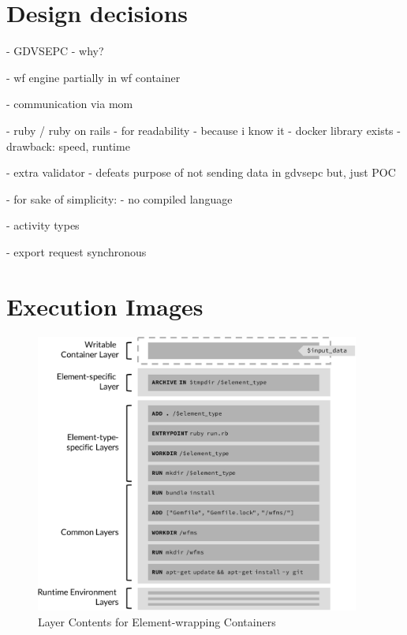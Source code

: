 
\section{Design decisions} %
\label{sec:design_decisions}

  - GDVSEPC
    - why?

  - wf engine partially in wf container

  - communication via mom

  - ruby / ruby on rails
    - for readability
    - because i know it
    - docker library exists
    - drawback: speed, runtime

  - extra validator
    - defeats purpose of not sending data in gdvsepc but, just POC

  - for sake of simplicity:
    - no compiled language

  - activity types

  - export request synchronous

\section{Execution Images} %
\label{sec:execution_images}
  \begin{figure}[htbp]
    \centering
    \includegraphics[width=0.95\textwidth]{content/images/execution_container-crop.pdf}
    \caption{Layer Contents for Element-wrapping Containers}
    \label{fig:detailed_layers_for_element_wrapping_containers}
  \end{figure}

